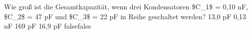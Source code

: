     {Wie groß ist die Gesamtkapazität, wenn drei Kondensatoren \$C\_1\$ = 0,10 nF, \$C\_2\$ = 47 pF und \$C\_3\$ = 22 pF in Reihe geschaltet werden?}
    {13,0 pF}
    {0,13 nF}
    {169 pF}
    {16,9 pF}
    {false}{false}